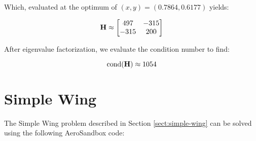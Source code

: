 Which, evaluated at the optimum of $(x, y) = (0.7864, 0.6177)$ yields:

\begin{equation}
    \mathbf{H} \approx
    \begin{bmatrix}
        497 & -315 \\
        -315 & 200
    \end{bmatrix}
\end{equation}

After eigenvalue factorization, we evaluate the condition number to find:

\begin{equation}
    \mathrm{cond}(\mathbf{H}) \approx 1054
\end{equation}


\section{Simple Wing}
\label{sect:simple-wing-code}

The Simple Wing problem described in Section \ref{sect:simple-wing} can be solved using the following AeroSandbox code:

